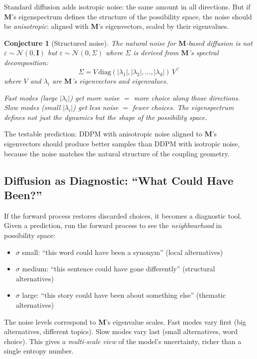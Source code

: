 \documentclass[11pt, a4paper]{article}
\newcommand{\M}{\mathbf{M}}
\theoremstyle{plain}
\newtheorem{conjecture}{Conjecture}
\theoremstyle{remark}
\begin{document}
Standard diffusion adds isotropic noise: the same amount in all directions.
But if $\M$'s eigenspectrum defines the structure of the possibility space, the noise should be \emph{anisotropic}: aligned with $\M$'s eigenvectors, scaled by their eigenvalues.

\begin{conjecture}[Structured noise]
The natural noise for $\M$-based diffusion is not $\varepsilon \sim \mathcal{N}(0, \mathbf{I})$ but $\varepsilon \sim \mathcal{N}(0, \Sigma)$ where $\Sigma$ is derived from $\M$'s spectral decomposition:
\[
    \Sigma = V \,\text{diag}(|\lambda_1|, |\lambda_2|, \ldots, |\lambda_d|)\, V^\top
\]
where $V$ and $\lambda_i$ are $\M$'s eigenvectors and eigenvalues.

Fast modes (large $|\lambda_i|$) get more noise $=$ more choice along those directions.
Slow modes (small $|\lambda_i|$) get less noise $=$ fewer choices.
The eigenspectrum defines not just the dynamics but the \emph{shape} of the possibility space.
\end{conjecture}

The testable prediction: DDPM with anisotropic noise aligned to $\M$'s eigenvectors should produce better samples than DDPM with isotropic noise, because the noise matches the natural structure of the coupling geometry.

\subsection{Diffusion as Diagnostic: ``What Could Have Been?''}

If the forward process restores discarded choices, it becomes a diagnostic tool.
Given a prediction, run the forward process to see the \emph{neighbourhood} in possibility space:
\begin{itemize}[nosep]
    \item $\sigma$ small: ``this word could have been a synonym'' (local alternatives)
    \item $\sigma$ medium: ``this sentence could have gone differently'' (structural alternatives)
    \item $\sigma$ large: ``this story could have been about something else'' (thematic alternatives)
\end{itemize}

The noise levels correspond to $\M$'s eigenvalue scales.
Fast modes vary first (big alternatives, different topics).
Slow modes vary last (small alternatives, word choice).
This gives a \emph{multi-scale view} of the model's uncertainty, richer than a single entropy number.
\end{document}
